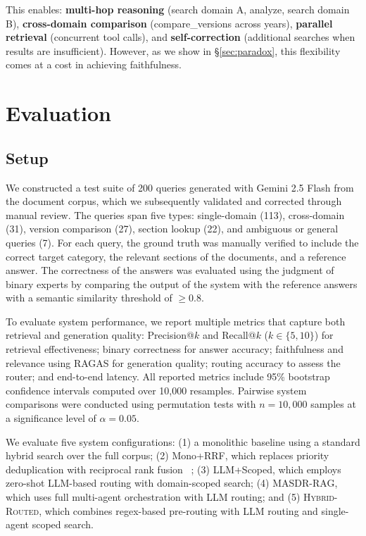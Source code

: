\documentclass{article}
\newcommand{\systemname}{\textsc{MASDR-RAG}}
\newcommand{\hybridname}{\textsc{Hybrid-Routed}}
\newcommand{\numQueries}{200}
\begin{document}
This enables: \textbf{multi-hop reasoning} (search domain A, analyze, search domain B), \textbf{cross-domain comparison} (compare\_versions across years), \textbf{parallel retrieval} (concurrent tool calls), and \textbf{self-correction} (additional searches when results are insufficient). However, as we show in \S\ref{sec:paradox}, this flexibility comes at a cost in achieving faithfulness.


\section{Evaluation}
\label{sec:evaluation}

\subsection{Setup}


We constructed a test suite of \numQueries{} queries generated with Gemini 2.5 Flash from the document corpus, which we subsequently validated and corrected through manual review. The queries span five types: single-domain (113), cross-domain (31), version comparison (27), section lookup (22), and ambiguous or general queries (7). For each query, the ground truth was manually verified to include the correct target category, the relevant sections of the documents, and a reference answer. The correctness of the answers was evaluated using the judgment of binary experts by comparing the output of the system with the reference answers with a semantic similarity threshold of $\geq 0.8$.

To evaluate system performance, we report multiple metrics that capture both retrieval and generation quality: Precision@$k$ and Recall@$k$ ($k \in \{5, 10\}$) for retrieval effectiveness; binary correctness for answer accuracy; faithfulness and relevance using RAGAS for generation quality; routing accuracy to assess the router; and end-to-end latency. All reported metrics include 95\% bootstrap confidence intervals computed over 10,000 resamples. Pairwise system comparisons were conducted using permutation tests with $n = 10{,}000$ samples at a significance level of $\alpha = 0.05$.

We evaluate five system configurations: (1) a monolithic baseline using a standard hybrid search over the full corpus; (2) Mono+RRF, which replaces priority deduplication with reciprocal rank fusion ~\citep{cormack2009rrf}; (3) LLM+Scoped, which employs zero-shot LLM-based routing with domain-scoped search; (4) \systemname{}, which uses full multi-agent orchestration with LLM routing; and (5) \hybridname{}, which combines regex-based pre-routing with LLM routing and single-agent scoped search.
\end{document}
